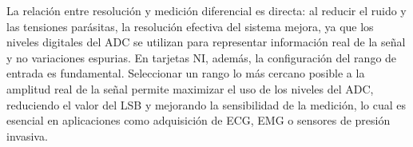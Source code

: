 La relación entre resolución y medición diferencial es directa: al reducir el ruido y las tensiones parásitas, la resolución efectiva del sistema mejora, ya que los niveles digitales del ADC se utilizan para representar información real de la señal y no variaciones espurias. En tarjetas NI, además, la configuración del rango de entrada es fundamental. Seleccionar un rango lo más cercano posible a la amplitud real de la señal permite maximizar el uso de los niveles del ADC, reduciendo el valor del LSB y mejorando la sensibilidad de la medición, lo cual es esencial en aplicaciones como adquisición de ECG, EMG o sensores de presión invasiva.